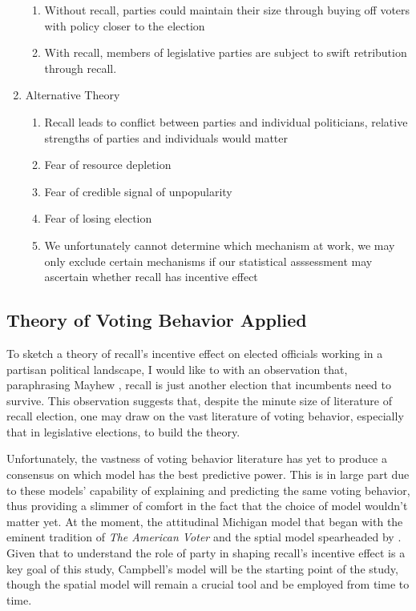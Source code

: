 \documentclass[hyphens, crop=false]{standalone}
\begin{document}
\begin{enumerate}
\begin{enumerate}
			\item 
			Without recall, parties could maintain their size through buying off voters with policy closer to the election
			\item 
			With recall, members of legislative parties are subject to swift retribution through recall.
		\end{enumerate}
		\item 
		Alternative Theory
		\begin{enumerate}
			\item 
			Recall leads to conflict between parties and individual politicians, relative strengths of parties and individuals would matter
			\item 
			Fear of resource depletion
			\item 
			Fear of credible signal of unpopularity
			\item 
			Fear of losing election
			\item 
			We unfortunately cannot determine which mechanism at work, we may only exclude certain mechanisms if our statistical asssessment may ascertain whether recall has incentive effect
		\end{enumerate}
	\end{enumerate}
	
	
	\subsection*{Theory of Voting Behavior Applied}
	To sketch a theory of recall's incentive effect on elected officials
	working in a partisan political landscape, I would like to with an observation that,
	paraphrasing Mayhew
	\autocite*{mayhewCongressElectoralConnection1974},
	recall is just another election that incumbents need to survive.
	This observation suggests that,
	despite the minute size of literature of recall election,
	one may draw on the vast literature of voting behavior,
	especially that in legislative elections,
	to build the theory. 
	
	Unfortunately, the vastness of voting behavior literature has
	yet to produce a consensus on which model has the best predictive power.
	This is in large part due to
	these models' capability of explaining and predicting the same voting behavior,
	thus
	providing a slimmer of comfort in the fact that the choice of model wouldn't matter yet.
	At the moment, the attitudinal Michigan model
	that began with the eminent tradition of \textit{The American Voter}
	\autocite{campbellAmericanVoter1960}
	 and the sptial model spearheaded by
	 \autocite{downsEconomicTheoryDemocracy1957}.
	 Given that to understand the role of party in shaping recall's incentive effect is
	 a key goal of this study,
	 Campbell's
	 \autocite*{campbellAmericanVoter1960}
	 model will be the starting point of the study,
	 though the spatial model will remain a crucial tool and be employed from time to time.
	
\end{document}
